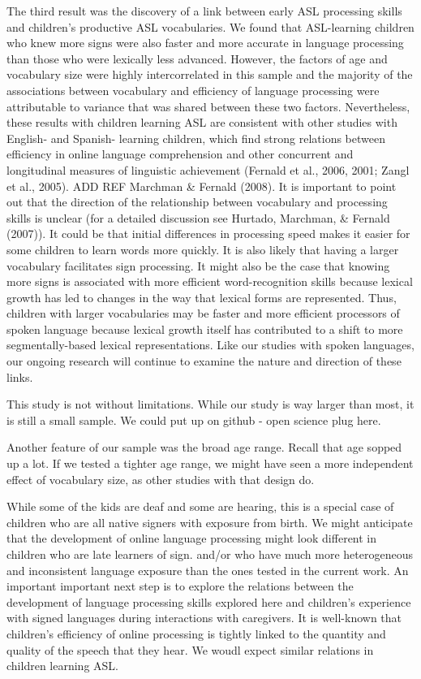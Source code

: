 \documentclass[12pt,]{article}
\begin{document}
The third result was the discovery of a link between early ASL
processing skills and children's productive ASL vocabularies. We found
that ASL-learning children who knew more signs were also faster and more
accurate in language processing than those who were lexically less
advanced. However, the factors of age and vocabulary size were highly
intercorrelated in this sample and the majority of the associations
between vocabulary and efficiency of language processing were
attributable to variance that was shared between these two factors.
Nevertheless, these results with children learning ASL are consistent
with other studies with English- and Spanish- learning children, which
find strong relations between efficiency in online language
comprehension and other concurrent and longitudinal measures of
linguistic achievement (Fernald et al., 2006, 2001; Zangl et al., 2005).
ADD REF Marchman \& Fernald (2008). It is important to point out that
the direction of the relationship between vocabulary and processing
skills is unclear (for a detailed discussion see Hurtado, Marchman, \&
Fernald (2007)). It could be that initial differences in processing
speed makes it easier for some children to learn words more quickly. It
is also likely that having a larger vocabulary facilitates sign
processing. It might also be the case that knowing more signs is
associated with more efficient word-recognition skills because lexical
growth has led to changes in the way that lexical forms are represented.
Thus, children with larger vocabularies may be faster and more efficient
processors of spoken language because lexical growth itself has
contributed to a shift to more segmentally-based lexical
representations. Like our studies with spoken languages, our ongoing
research will continue to examine the nature and direction of these
links.

This study is not without limitations. While our study is way larger
than most, it is still a small sample. We could put up on github - open
science plug here.

Another feature of our sample was the broad age range. Recall that age
sopped up a lot. If we tested a tighter age range, we might have seen a
more independent effect of vocabulary size, as other studies with that
design do.

While some of the kids are deaf and some are hearing, this is a special
case of children who are all native signers with exposure from birth. We
might anticipate that the development of online language processing
might look different in children who are late learners of sign. and/or
who have much more heterogeneous and inconsistent language exposure than
the ones tested in the current work. An important important next step is
to explore the relations between the development of language processing
skills explored here and children's experience with signed languages
during interactions with caregivers. It is well-known that children's
efficiency of online processing is tightly linked to the quantity and
quality of the speech that they hear. We woudl expect similar relations
in children learning ASL.
\end{document}
